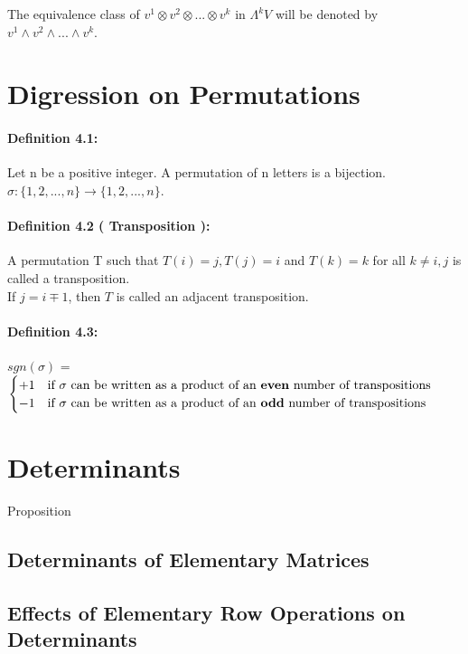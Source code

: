\documentclass{article}
\begin{document}
The equivalence class of $v^1\otimes v^2\otimes...\otimes v^k$ in $\Lambda^k V$ will be denoted by $v^1\wedge v^2\wedge...\wedge v^k$.\\
\section{Digression on Permutations}
\paragraph{Definition 4.1:} Let n be a positive integer. A permutation of n letters is a bijection.  $\sigma:\{1,2,...,n\}\rightarrow \{1,2,...,n\}$.\\
\paragraph{Definition 4.2 ( Transposition ):}  A permutation T such that $T(i) = j, T(j) = i$ and $T(k) = k$ for all $k\neq i,j$ is called a transposition.\\
If $j= i\mp 1$, then $T$ is called an adjacent transposition.\\
\paragraph{Definition 4.3:} 
$sgn(\sigma)$ = 
$\begin{cases} 
       +1 & \text{if $\sigma$ can be written as a product of an \textbf{even} number of transpositions} \\ 
       -1 & \text{if $\sigma$ can be written as a product of an \textbf{odd} number of transpositions} 
   \end{cases}$ 

\section{Determinants}
Proposition

\subsection{Determinants of Elementary Matrices}

\subsection{Effects of Elementary Row Operations on Determinants}
\end{document}
